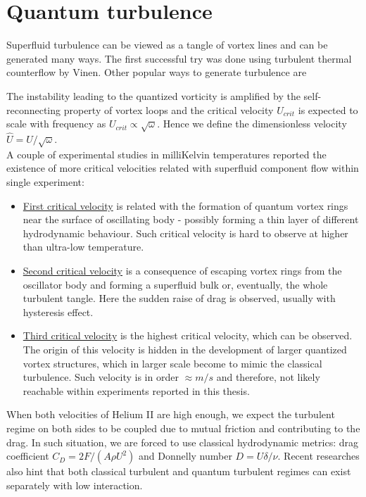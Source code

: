 \section{Quantum turbulence}

Superfluid turbulence can be viewed as a tangle of vortex lines and can be generated many ways. The first successful try was done using turbulent thermal counterflow by Vinen. Other popular ways to generate turbulence are

The instability leading to the quantized vorticity is amplified by the self-reconnecting property of vortex loops and the critical velocity $U_{crit}$ is expected to scale with frequency as $U_{crit} \propto \sqrt{\omega}$. Hence we define the dimensionless velocity $\hat{U} = U / \sqrt{\omega}$.\\
A couple of experimental studies in milliKelvin temperatures reported the existence of more critical velocities related with superfluid component flow within single experiment:

\begin{itemize}
	\item \underline{First critical velocity} is related with the formation of quantum vortex rings near the surface of oscillating body - possibly forming a thin layer of different hydrodynamic behaviour. Such critical velocity is hard to observe at higher than ultra-low temperature.

	\item \underline{Second critical velocity} is a consequence of escaping vortex rings from the oscillator body and forming a superfluid bulk or, eventually, the whole turbulent tangle. Here the sudden raise of drag is observed, usually with hysteresis effect.

	\item \underline{Third critical velocity} is the highest critical velocity, which can be observed. The origin of this velocity is hidden in the development of larger quantized vortex structures, which in larger scale become to mimic the classical turbulence. Such velocity is in order $\approx \unit{m/s}$ and therefore, not likely reachable within experiments reported in this thesis.
\end{itemize}

When both velocities of Helium II are high enough, we expect the turbulent regime on both sides to be coupled due to mutual friction and contributing to the drag. In such situation, we are forced to use classical hydrodynamic metrics: drag coefficient $C_D = 2F / (A\rho U^2)$ and Donnelly number $D = U \delta / \nu$. Recent researches also hint that both classical turbulent and quantum turbulent regimes can exist separately with low interaction.

